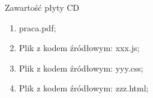 \cleardoublepage
{}
\thispagestyle{plain}

{}

Zawartość płyty CD
\begin{enumerate}
\item praca.pdf;
\item Plik z kodem źródłowym: xxx.js;
\item Plik z kodem źródłowym: yyy.css;
\item Plik z kodem źródłowym: zzz.html;
\end{enumerate}
